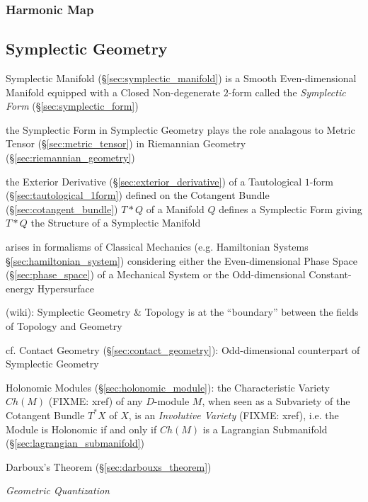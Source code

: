\subsubsection{Harmonic Map}\label{sec:harmonic_map}



\subsection{Symplectic Geometry}\label{sec:symplectic_geometry}

Symplectic Manifold (\S\ref{sec:symplectic_manifold}) is a Smooth
Even-dimensional Manifold equipped with a Closed Non-degenerate $2$-form called
the \emph{Symplectic Form} (\S\ref{sec:symplectic_form})

the Symplectic Form in Symplectic Geometry plays the role analagous to Metric
Tensor (\S\ref{sec:metric_tensor}) in Riemannian Geometry
(\S\ref{sec:riemannian_geometry})

the Exterior Derivative (\S\ref{sec:exterior_derivative}) of a Tautological
$1$-form (\S\ref{sec:tautological_1form}) defined on the Cotangent Bundle
(\S\ref{sec:cotangent_bundle}) $T * Q$ of a Manifold $Q$ defines a Symplectic
Form giving $T * Q$ the Structure of a Symplectic Manifold

arises in formalisms of Classical Mechanics (e.g. Hamiltonian Systems
\S\ref{sec:hamiltonian_system}) considering either the Even-dimensional Phase
Space (\S\ref{sec:phase_space}) of a Mechanical System or the Odd-dimensional
Constant-energy Hypersurface

(wiki): Symplectic Geometry \& Topology is at the ``boundary'' between the
fields of Topology and Geometry

\fist cf. Contact Geometry (\S\ref{sec:contact_geometry}): Odd-dimensional
counterpart of Symplectic Geometry

\fist Holonomic Modules (\S\ref{sec:holonomic_module}): the Characteristic
Variety $Ch(M)$ (FIXME: xref) of any $D$-module $M$, when seen as a Subvariety
of the Cotangent Bundle $T^*X$ of $X$, is an \emph{Involutive Variety} (FIXME:
xref), i.e. the Module is Holonomic if and only if $Ch(M)$ is a Lagrangian
Submanifold (\S\ref{sec:lagrangian_submanifold})

Darboux's Theorem (\S\ref{sec:darbouxs_theorem})

\emph{Geometric Quantization}

